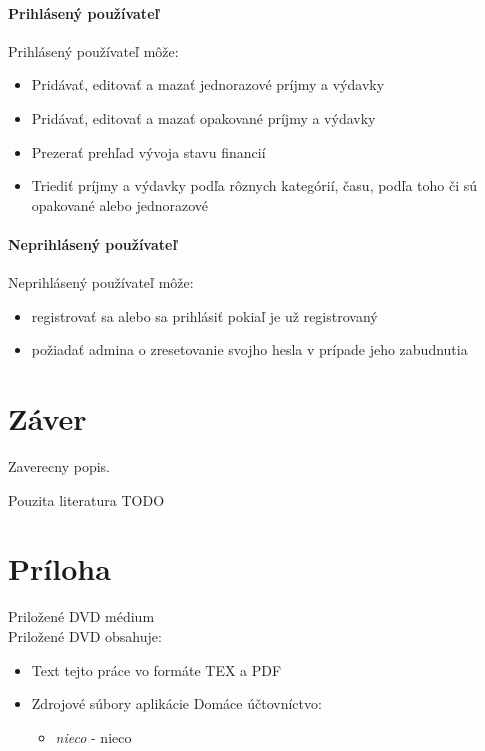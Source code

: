 \documentclass[12pt]{book}
\begin{document}
\subsubsection{Prihlásený používateľ}
Prihlásený používateľ môže:
\begin{itemize}
\item{Pridávať, editovať a mazať jednorazové príjmy a výdavky}
\item{Pridávať, editovať a mazať opakované príjmy a výdavky}
\item{Prezerať prehľad vývoja stavu financií}
\item{Triediť príjmy a výdavky podľa rôznych kategórií, času, podľa toho či sú opakované alebo jednorazové}
\end{itemize}

\subsubsection{Neprihlásený používateľ}
Neprihlásený používateľ môže:
\begin{itemize}
\item{registrovať sa alebo sa prihlásiť pokiaľ je už registrovaný}
\item{požiadať admina o zresetovanie svojho hesla v prípade jeho zabudnutia}
\end{itemize}



\chapter{Záver}\label{chap:outro}

Zaverecny popis.

\backmatter

\nocite{*}



Pouzita literatura TODO

\newcommand{\dbappendix}[1]{\chapter{#1}}
\appendix
\dbappendix{Príloha}\label{appA}
{\large Priložené DVD médium}\\

Priložené DVD obsahuje:\\
\begin{itemize}
\item Text tejto práce vo formáte TEX a PDF
\item Zdrojové súbory aplikácie Domáce účtovníctvo:
	\begin{itemize}
		\item {\em nieco} - nieco
	\end{itemize}
\end{itemize}
\end{document}
